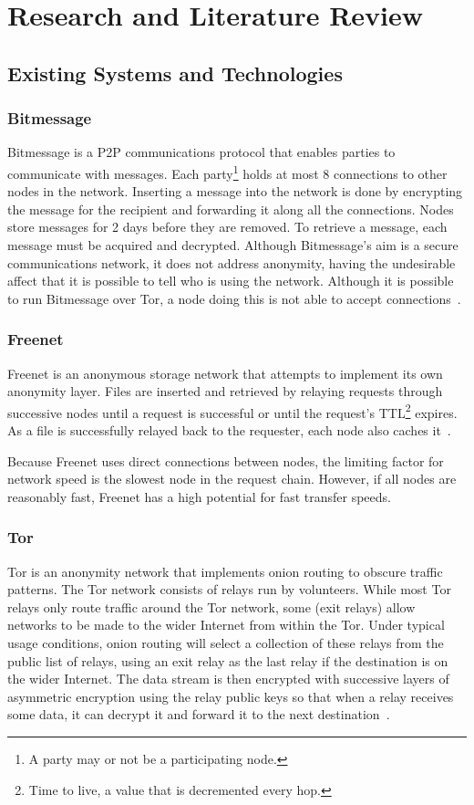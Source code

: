 \section{Research and Literature Review}
	\subsection{Existing Systems and Technologies}
		\subsubsection*{Bitmessage}\label{bitmessage_existing}
			Bitmessage is a P2P communications protocol that enables parties to communicate with messages. Each party\footnote{A party may or not be a participating node.} holds at most 8 connections to other nodes in the network. Inserting a message into the network is done by encrypting the message for the recipient and forwarding it along all the connections. Nodes store messages for 2 days before they are removed. To retrieve a message, each message must be acquired and decrypted. Although Bitmessage's aim is a secure communications network, it does not address anonymity, having the undesirable affect that it is possible to tell who is using the network. Although it is possible to run Bitmessage over Tor, a node doing this is not able to accept connections~\cite{bitmsg}.
		\subsubsection*{Freenet}\label{freenet_existing}
			Freenet is an anonymous storage network that attempts to implement its own anonymity layer. Files are inserted and retrieved by relaying requests through successive nodes until a request is successful or until the request's TTL\footnote{Time to live, a value that is decremented every hop.} expires. As a file is successfully relayed back to the requester, each node also caches it~\cite{clarke2001freenet}.
			
			Because Freenet uses direct connections between nodes, the limiting factor for network speed is the slowest node in the request chain. However, if all nodes are reasonably fast, Freenet has a high potential for fast transfer speeds.
		\subsubsection*{Tor}
			Tor is an anonymity network that implements onion routing to obscure traffic patterns. The Tor network consists of relays run by volunteers. While most Tor relays only route traffic around the Tor network, some (exit relays) allow networks to be made to the wider Internet from within the Tor. Under typical usage conditions, onion routing will select a collection of these relays from the public list of relays, using an exit relay as the last relay if the destination is on the wider Internet. The data stream is then encrypted with successive layers of asymmetric encryption using the relay public keys so that when a relay receives some data, it can decrypt it and forward it to the next destination~\cite{dingledine2004tor}.
			
